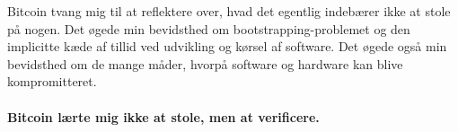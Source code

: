 Bitcoin tvang mig til at reflektere over, hvad det egentlig indebærer ikke at stole på nogen.
Det øgede min bevidsthed om bootstrapping-problemet og den implicitte
kæde af tillid ved udvikling og kørsel af software. Det øgede også min
bevidsthed om de mange måder, hvorpå software og hardware kan blive
kompromitteret.

\paragraph{Bitcoin lærte mig ikke at stole, men at verificere.}

%
%
%
%
